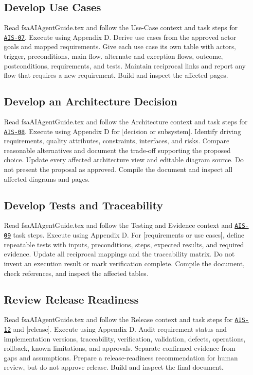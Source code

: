 \subsection{Develop Use Cases}
\begingroup\ttfamily\raggedright
\noindent Read fsaAIAgentGuide.tex and follow the Use-Case context and task steps for \hyperref[Skill:AIS-07]{\texttt{AIS-07}}. Execute using Appendix D. Derive use cases from the approved actor goals and mapped requirements. Give each use case its own table with actors, trigger, preconditions, main flow, alternate and exception flows, outcome, postconditions, requirements, and tests. Maintain reciprocal links and report any flow that requires a new requirement. Build and inspect the affected pages.\par
\endgroup


\subsection{Develop an Architecture Decision}
\begingroup\ttfamily\raggedright
\noindent Read fsaAIAgentGuide.tex and follow the Architecture context and task steps for \hyperref[Skill:AIS-08]{\texttt{AIS-08}}. Execute using Appendix D for [decision or subsystem]. Identify driving requirements, quality attributes, constraints, interfaces, and risks. Compare reasonable alternatives and document the trade-off supporting the proposed choice. Update every affected architecture view and editable diagram source. Do not present the proposal as approved. Compile the document and inspect all affected diagrams and pages.\par
\endgroup


\subsection{Develop Tests and Traceability}
\begingroup\ttfamily\raggedright
\noindent Read fsaAIAgentGuide.tex and follow the Testing and Evidence context and \hyperref[Skill:AIS-09]{\texttt{AIS-09}} task steps. Execute using Appendix D. For [requirements or use cases], define repeatable tests with inputs, preconditions, steps, expected results, and required evidence. Update all reciprocal mappings and the traceability matrix. Do not invent an execution result or mark verification complete. Compile the document, check references, and inspect the affected tables.\par
\endgroup


\subsection{Review Release Readiness}
\begingroup\ttfamily\raggedright
\noindent Read fsaAIAgentGuide.tex and follow the Release context and task steps for \hyperref[Skill:AIS-12]{\texttt{AIS-12}} and [release]. Execute using Appendix D. Audit requirement status and implementation versions, traceability, verification, validation, defects, operations, rollback, known limitations, and approvals. Separate confirmed evidence from gaps and assumptions. Prepare a release-readiness recommendation for human review, but do not approve release. Build and inspect the final document.\par
\endgroup


